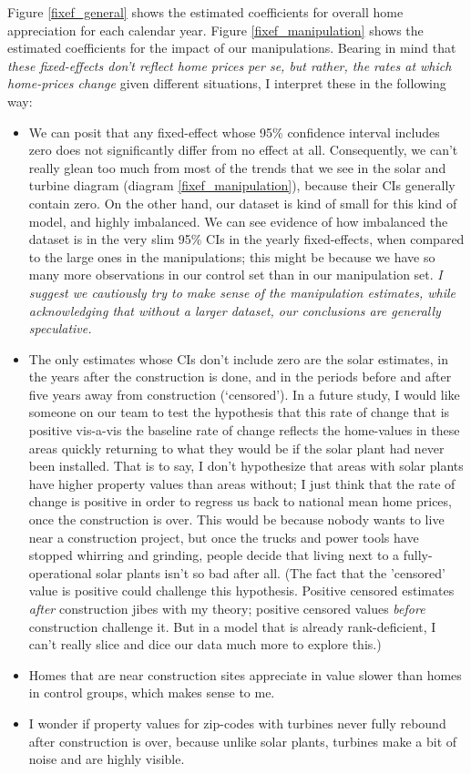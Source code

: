 \documentclass{article}
\begin{document}
Figure \ref{fixef_general} shows the estimated coefficients for overall home appreciation for each calendar year.
Figure \ref{fixef_manipulation} shows the estimated coefficients for the impact of our manipulations.
Bearing in mind that \emph{these fixed-effects don't reflect home prices per se, but rather, the rates at which home-prices change} given different situations, I interpret these in the following way:
\begin{itemize}
\item We can posit that any fixed-effect whose 95\% confidence interval includes zero does not significantly differ from no effect at all. 
Consequently, we can't really glean too much from  most of the trends that we see in the solar and turbine diagram (diagram \ref{fixef_manipulation}), because their CIs generally contain zero. 
On the other hand, our dataset is kind of small for this kind of model, and highly imbalanced.
We can see evidence of how imbalanced the dataset is in the very slim 95\% CIs in the yearly fixed-effects, when compared to the large ones in the manipulations; this might be because we have so many more observations in our control set than in our manipulation set. 
\emph{I suggest we cautiously try to make sense of the manipulation estimates, while acknowledging that without a larger dataset, our conclusions are generally speculative.}
\item The only estimates whose CIs don't include zero are the solar estimates, in the years after the construction is done, and in the periods before and after five years away from construction (`censored'). 
In a future study, I would like someone on our team to test the hypothesis that this rate of change that is positive vis-a-vis the baseline rate of change reflects the home-values in these areas quickly returning to what they would be if the solar plant had never been installed.
That is to say, I don't hypothesize that areas with solar plants have higher property values than areas without; I just think that the rate of change is positive in order to regress us back to national mean home prices, once the construction is over. 
This would be because nobody wants to live near a construction project, but once the trucks and power tools have stopped whirring and grinding, people decide that living next to a fully-operational solar plants isn't so bad after all.
(The fact that the 'censored' value is positive could challenge this hypothesis. Positive censored estimates \emph{after} construction jibes with my theory; positive censored values \emph{before} construction challenge it. But in a model that is already rank-deficient, I can't really slice and dice our data much more to explore this.) 
\item Homes that are near construction sites appreciate in value slower than homes in control groups, which makes sense to me.
\item I wonder if property values for zip-codes with turbines never fully rebound after construction is over, because unlike solar plants, turbines make a bit of noise and are highly visible.
\end{itemize}
\end{document}
